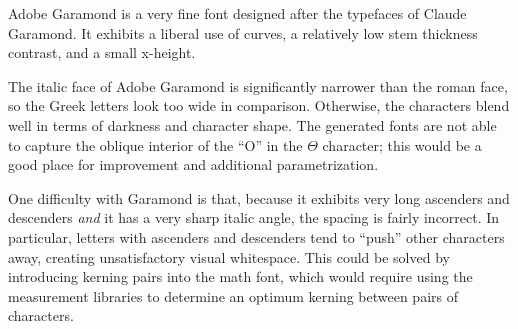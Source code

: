 
Adobe Garamond is a very fine font designed after the typefaces of Claude
Garamond. It exhibits a liberal use of curves, a relatively low stem thickness
contrast, and a small x-height.

The italic face of Adobe Garamond is significantly narrower than the roman face,
so the Greek letters look too wide in comparison. Otherwise, the characters
blend well in terms of darkness and character shape. The generated fonts are not
able to capture the oblique interior of the ``O'' in the $\Theta$ character;
this would be a good place for improvement and additional parametrization.

One difficulty with Garamond is that, because it exhibits very long ascenders
and descenders \emph{and} it has a very sharp italic angle, the spacing is
fairly incorrect. In particular, letters with ascenders and descenders tend to
``push'' other characters away, creating unsatisfactory visual whitespace. This
could be solved by introducing kerning pairs into the math font, which would
require using the measurement libraries to determine an optimum kerning between
pairs of characters.
